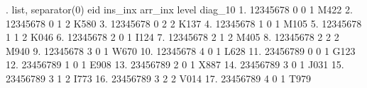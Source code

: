 . list, separator(0)
{\smallskip}
     {\TLC}
     {\VBAR}      eid   ins_in{\tytilde}x   arr_in{\tytilde}x   level   diag_{\tytilde}10 {\VBAR}
     {\LFTT}
  1. {\VBAR} 12345678          0          0       1       M422 {\VBAR}
  2. {\VBAR} 12345678          0          1       2       K580 {\VBAR}
  3. {\VBAR} 12345678          0          2       2       K137 {\VBAR}
  4. {\VBAR} 12345678          1          0       1       M105 {\VBAR}
  5. {\VBAR} 12345678          1          1       2       K046 {\VBAR}
  6. {\VBAR} 12345678          2          0       1       I124 {\VBAR}
  7. {\VBAR} 12345678          2          1       2       M405 {\VBAR}
  8. {\VBAR} 12345678          2          2       2       M940 {\VBAR}
  9. {\VBAR} 12345678          3          0       1       W670 {\VBAR}
 10. {\VBAR} 12345678          4          0       1       L628 {\VBAR}
 11. {\VBAR} 23456789          0          0       1       G123 {\VBAR}
 12. {\VBAR} 23456789          1          0       1       E908 {\VBAR}
 13. {\VBAR} 23456789          2          0       1       X887 {\VBAR}
 14. {\VBAR} 23456789          3          0       1       J031 {\VBAR}
 15. {\VBAR} 23456789          3          1       2       I773 {\VBAR}
 16. {\VBAR} 23456789          3          2       2       V014 {\VBAR}
 17. {\VBAR} 23456789          4          0       1       T979 {\VBAR}
     {\BLC}
{\smallskip}
